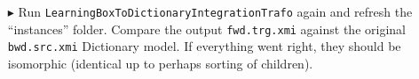 \begin{itemize}
\item[$\blacktriangleright$] Run \texttt{LearningBoxToDictionaryIntegrationTrafo} again and refresh the ``instances'' folder. 
Compare the output \texttt{fwd.trg.xmi} against the original \texttt{bwd.src.xmi} Dictionary model. 
If everything went right, they should be isomorphic (identical up to perhaps sorting of children).
\end{itemize}

